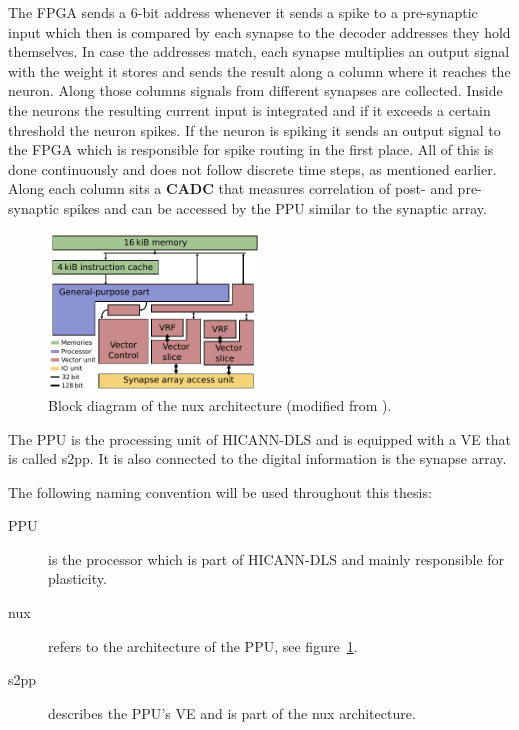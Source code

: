 The \ac{FPGA} sends a 6-bit address whenever it sends a spike to a pre-synaptic input which then is compared by each synapse to the decoder addresses they hold themselves.
In case the addresses match, each synapse multiplies an output signal with the weight it stores and sends the result along a column where it reaches the neuron.
Along those columns signals from different synapses are collected.
Inside the neurons the resulting current input is integrated and if it exceeds a certain threshold the neuron spikes.
If the neuron is spiking it sends an output signal to the FPGA which is responsible for spike routing in the first place.
All of this is done continuously and does not follow discrete time steps, as mentioned earlier.
Along each column sits a \textbf{\ac{CADC}} that measures correlation of post- and pre-synaptic spikes and can be accessed by the \ac{PPU} similar to the synaptic array.
\begin{figure}
\captionsetup{format=plain, indention=.6cm, labelsep=newline,singlelinecheck=false}
    \centering
    \includegraphics[width=0.5\textwidth]{pictures/nux.pdf}
    \caption{\label{fig:nux} Block diagram of the nux architecture (modified from \citeauthor{PPU}).}
\end{figure}
The \ac{PPU} is the processing unit of \ac{HICANN-DLS} and is equipped with a \ac{VE} that is called \ac{s2pp}.
It is also connected to the digital information is the synapse array.

The following naming convention will be used throughout this thesis:
\begin{description}
    \item[\ac{PPU}] is the processor which is part of \ac{HICANN-DLS} and mainly responsible for plasticity.
    \item[nux] refers to the architecture of the \ac{PPU}, see figure~\ref{fig:nux}.
    \item[\ac{s2pp}] describes the \ac{PPU}'s \ac{VE} and is part of the nux architecture.
\end{description}

